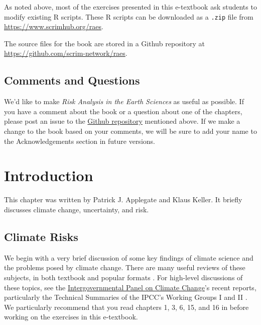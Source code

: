 \documentclass[
  11pt,
]{book}
\begin{document}
As noted above, most of the exercises presented in this e-textbook ask students to modify existing R scripts. These R scripts can be downloaded as a \texttt{.zip} file from \url{https://www.scrimhub.org/raes}.

The source files for the book are stored in a Github repository at \url{https://github.com/scrim-network/raes}.

\hypertarget{comments-and-questions}{%
\section*{Comments and Questions}\label{comments-and-questions}}


We'd like to make \emph{Risk Analysis in the Earth Sciences} as useful as possible. If you have a comment about the book or a question about one of the chapters, please post an issue to the \href{https://github.com/scrim-network/raes}{Github repository} mentioned above. If we make a change to the book based on your comments, we will be sure to add your name to the Acknowledgements section in future versions.

\mainmatter

\hypertarget{introduction}{%
\chapter{Introduction}\label{introduction}}

This chapter was written by Patrick J. Applegate and Klaus Keller. It briefly discusses climate change, uncertainty, and risk.

\hypertarget{climate-risks}{%
\section{Climate Risks}\label{climate-risks}}

We begin with a very brief discussion of some key findings of climate science and the problems posed by climate change. There are many useful reviews of these subjects, in both textbook and popular formats \citep{Kump2009-no, Alley2011-by}. For high-level discussions of these topics, see the \href{http://www.ipcc.ch/index.htm}{Intergovernmental Panel on Climate Change}'s recent reports, particularly the Technical Summaries of the IPCC's Working Groups I and II \citep{Stocker2013-am, Field2013-pl}. We particularly recommend that you read chapters 1, 3, 6, 15, and 16 in \citet{Kump2009-no} before working on the exercises in this e-textbook.
\end{document}
